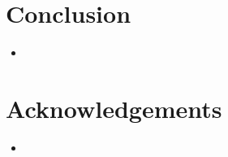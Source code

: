 \documentclass[portrait,color=UCLburgundy,margin=2cm]{uclposter}
\begin{document}
\begin{multicols}{2}
\section*{Conclusion}
    \begin{itemize}
        \item \blindtext
    \end{itemize}

\AtNextBibliography{\small}
\printbibliography

\small
\section*{Acknowledgements}
    \begin{itemize}
        \item \blindtext
    \end{itemize}

\end{multicols}
\end{document}
